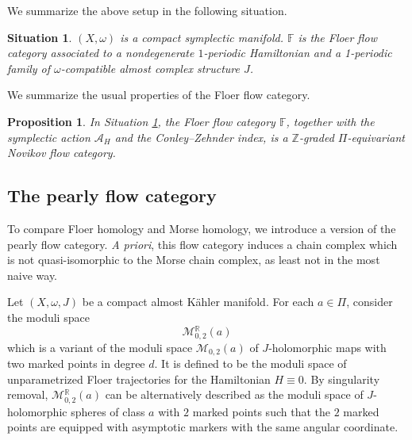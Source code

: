\documentclass[reqno, 10pt]{amsart}
\numberwithin{equation}{section}
\numberwithin{equation}{section}
\newtheorem{situationf}{Situation}
\newtheorem{prop}[thm]{Proposition}
\theoremstyle{definition}
\theoremstyle{remark}
\newcommand{\beqn}{\begin{equation*}}
\newcommand{\eeqn}{\end{equation*}}
\newcommand{\mb}{\mathbb}
\newcommand{\mc}{\mathcal}
\begin{document}
We summarize the above setup in the following situation.

\begin{situationf}\label{situationf1}
$(X, \omega)$ is a compact symplectic manifold. ${\mb F}$ is the Floer flow category associated to a nondegenerate $1$-periodic Hamiltonian and a 1-periodic family of $\omega$-compatible almost complex structure $J$.
\end{situationf}

We summarize the usual properties of the Floer flow category.

\begin{prop}
In Situation \ref{situationf1}, the  Floer flow category ${\mb F}$, together with the symplectic action ${\mc A}_H$ and the Conley--Zehnder index, is a ${\mb Z}$-graded $\Pi$-equivariant Novikov flow category.
\end{prop}




\subsection{The pearly flow category}\label{subsection_pearly}

To compare Floer homology and Morse homology, we introduce a version of the pearly flow category. {\it A priori}, this flow category induces a chain complex which is not quasi-isomorphic to the Morse chain complex, as least not in the most naive way.

Let $(X, \omega, J)$ be a compact almost K\"ahler manifold. For each $a \in \Pi$, consider the moduli space 
\beqn
{\mc M}{}_{0,2}^{\mb R}(a)
\eeqn
which is a variant of the moduli space ${\mc M}{}_{0,2}(a)$ of $J$-holomorphic maps with two marked points in degree $d$. It is defined to be the moduli space of unparametrized Floer trajectories for the Hamiltonian $H \equiv 0$. By singularity removal, ${\mc M}{}_{0,2}^{\mb R}(a)$ can be alternatively described as the moduli space of $J$-holomorphic spheres of class $a$ with $2$ marked points such that the $2$ marked points are equipped with asymptotic markers with the same angular coordinate.
\end{document}
